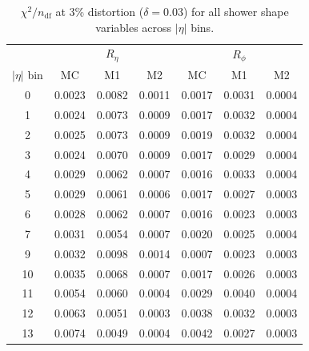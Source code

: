 \documentclass[12pt,a4paper]{article}
\begin{document}
\begin{table}[htbp]
\centering
\caption{%
  $\chi^2/n_\text{df}$ at 3\% distortion ($\delta=0.03$) for all shower shape
  variables across $|\eta|$ bins.
}
\label{tab:chi2_3pct}
\small
\begin{tabular}{
  c
  S S S
  S S S
}
\toprule
& 
&  \\
\cmidrule(lr){2-4}\cmidrule(lr){5-7}
{$|\eta|$ bin}
& {MC} & {M1} & {M2}
& {MC} & {M1} & {M2} \\
  & 0.0023 & 0.0082 & 0.0011 & 0.0017 & 0.0031 & 0.0004 \\
1  & 0.0024 & 0.0073 & 0.0009 & 0.0017 & 0.0032 & 0.0004 \\
2  & 0.0025 & 0.0073 & 0.0009 & 0.0019 & 0.0032 & 0.0004 \\
3  & 0.0024 & 0.0070 & 0.0009 & 0.0017 & 0.0029 & 0.0004 \\
4  & 0.0029 & 0.0062 & 0.0007 & 0.0016 & 0.0033 & 0.0004 \\
5  & 0.0029 & 0.0061 & 0.0006 & 0.0017 & 0.0027 & 0.0003 \\
6  & 0.0028 & 0.0062 & 0.0007 & 0.0016 & 0.0023 & 0.0003 \\
7  & 0.0031 & 0.0054 & 0.0007 & 0.0020 & 0.0025 & 0.0004 \\
9  & 0.0032 & 0.0098 & 0.0014 & 0.0007 & 0.0023 & 0.0003 \\
10 & 0.0035 & 0.0068 & 0.0007 & 0.0017 & 0.0026 & 0.0003 \\
11 & 0.0054 & 0.0060 & 0.0004 & 0.0029 & 0.0040 & 0.0004 \\
12 & 0.0063 & 0.0051 & 0.0003 & 0.0038 & 0.0032 & 0.0003 \\
13 & 0.0074 & 0.0049 & 0.0004 & 0.0042 & 0.0027 & 0.0003 \\
\bottomrule
\end{tabular}
\end{table}
\end{document}
